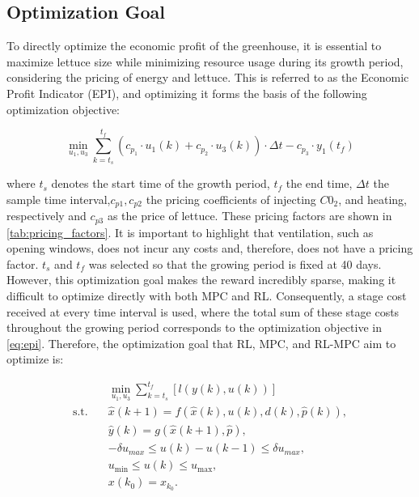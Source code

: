 \subsection{Optimization Goal}
To directly optimize the economic profit of the greenhouse, it is essential to maximize lettuce size while minimizing resource usage during its growth period, considering the pricing of energy and lettuce. This is referred to as the Economic Profit Indicator (EPI), and optimizing it forms the basis of the following optimization objective:

\begin{equation}\label{eq:epi}
	\min_{u_1,u_3}\sum_{k = t_s}^{t_f} (c_{p_1} \cdot u_1(k) + c_{p_2} \cdot u_3(k))\cdot \Delta t - c_{p_3} \cdot y_1(t_f)
\end{equation}

where $t_s$ denotes the start time of the growth period, $t_f$ the end time, $\Delta t$ the sample time interval,$c_{p1},c_{p2}$ the pricing coefficients of injecting $C0_2$, and heating, respectively and $c_{p3}$ as the price of lettuce. These pricing factors are shown in \autoref{tab:pricing_factors}. It is important to highlight that ventilation, such as opening windows, does not incur any costs and, therefore, does not have a pricing factor. $t_s$ and $t_f$ was selected so that the growing period is fixed at 40 days.\\
However, this optimization goal makes the reward incredibly sparse, making it difficult to optimize directly with both MPC and RL. Consequently, a stage cost received at every time interval is used, where the total sum of these stage costs throughout the growing period corresponds to the optimization objective in \autoref{eq:epi}. Therefore, the optimization goal that RL, MPC, and RL-MPC aim to optimize is:

\begin{subequations} \label{eq:optimisation-goal}
	\begin{align}
		& \min_{u_1,u_3} \sum_{k = t_s}^{t_f} \left[ l(y(k),u(k)) \right] \label{eq:stage-cost-epi} \\
		\text{s.t.} \quad 
		& \hat{x}(k+1) = f(\hat{x}(k), u(k), d(k), \hat{p}(k)), \label{eq:constraint-1} \\
		& \hat{y}(k) = g(\hat{x}(k+1), \hat{p}), \label{eq:constraint-dynamics} \\
		& -\delta u_{max} \leq u(k) - u(k-1) \leq \delta u_{max}, \label{eq:constraint-delta-u} \\
		& u_{\min} \leq u(k) \leq u_{\max}, \label{eq:constraint-u-limits} \\
		& x(k_0) = x_{k_0}. \label{eq:constraint-initial}
	\end{align}
\end{subequations}

